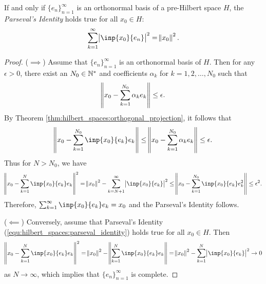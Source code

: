 \begin{thm}
If and only if $\{ e_n \}_{n=1}^{\infty}$ is an orthonormal basis of a 
pre-Hilbert space $H$, the \emph{Parseval's Identity} holds true for all 
$x_0 \in H$:
\begin{equation}
    \label{equ:hilbert_spaces:parseval_identity}
    \sum_{k=1}^{\infty} \abs{\inp{x_0}{e_n}}^2 = \norm{x_0}^2.
\end{equation}
\end{thm}
\begin{proof}
($\implies$)
Assume that $\{ e_n \}_{n=1}^{\infty}$ is an orthonormal basis of $H$. 
Then for any $\epsilon > 0$, there exist an $N_0 \in \mathbb{N}^\ast$ and coefficients 
$\alpha_k$ for $k = 1, 2, \ldots, N_0$ such that 
\begin{equation*}
    \norm{x_0 - \sum_{k=1}^{N_0} \alpha_k e_k} \le \epsilon. 
\end{equation*}
By Theorem \ref{thm:hilbert_spaces:orthogonal_projection}, it follows that 
\begin{equation*}
    \norm{x_0 - \sum_{k=1}^{N_0} \inp{x_0}{e_k} e_k} 
    \le \norm{x_0 - \sum_{k=1}^{N_0} \alpha_k e_k} \le \epsilon. 
\end{equation*}
Thus for $N > N_0$, we have 
\begin{equation*}
    \norm{x_0 - \sum_{k=1}^{N} \inp{x_0}{e_k} e_k}^2
    = \norm{x_0}^2 - \sum_{k=N+1}^{\infty} \abs{\inp{x_0}{e_k}}^2 
    \le \norm{x_0 - \sum_{k=1}^{N_0} \inp{x_0}{e_k} e_k^2}
    \le \epsilon^2. 
\end{equation*}
Therefore, $\sum_{k=1}^{\infty} \inp{x_0}{e_k} e_k = x_0$ and the Parseval's 
Identity follows. 

($\impliedby$)
Conversely, assume that Parseval's Identity 
(\ref{equ:hilbert_spaces:parseval_identity}) holds true for all $x_0 \in H$. 
Then 
\begin{equation*}
    \norm{x_0 - \sum_{k=1}^{N} \inp{x_0}{e_k} e_k}^2 
    = \norm{x_0}^2 - \norm{\sum_{k=1}^{N} \inp{x_0}{e_k} e_k} 
    = \norm{x_0}^2 - \sum_{k=1}^{N} \abs{\inp{x_0}{e_k}}^2 
    \to 0
\end{equation*}
as $N \to \infty$, which implies that $\{ e_n \}_{n=1}^{\infty}$ is 
complete. 
\end{proof}

